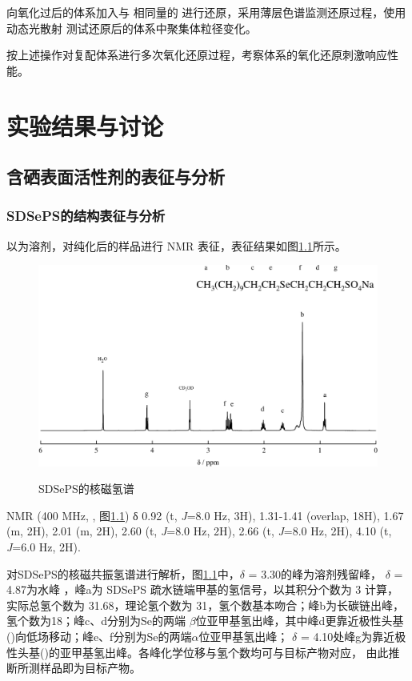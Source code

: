 \documentclass[bachelor,winfonts,replaceperiod]{jnuthesis}
\begin{document}
    向氧化过后的体系加入与  相同量的  进行还原，采用薄层色谱监测还原过程，使用动态光散射
    测试还原后的体系中聚集体粒径变化。
    
    按上述操作对复配体系进行多次氧化还原过程，考察体系的氧化还原刺激响应性能。
    
    \chapter{实验结果与讨论}\label{chapter:results}
    \section{含硒表面活性剂的表征与分析}
    \subsection{SDSePS的结构表征与分析}
    以为溶剂，对纯化后的样品进行 NMR 表征，表征结果如图\ref{fig:SDSePS-nmr}所示。
    \begin{figure}[htbp]
        \centering
        \includegraphics[width=.75\textwidth]{figure/SDSePS-nmr.pdf}\\
        \caption{SDSePS的核磁氢谱}\label{fig:SDSePS-nmr}
    \end{figure}
     
     NMR (400 MHz, , 图\ref{fig:SDSePS-nmr}) δ 0.92 (t, \textit{J}=8.0 Hz, 3H), 1.31-1.41 (overlap, 18H), 
    1.67 (m, 2H), 2.01 (m, 2H), 2.60 (t, \textit{J}=8.0 Hz, 2H), 2.66 (t, \textit{J}=8.0 Hz, 2H),  4.10 (t, \textit{J}=6.0 Hz, 2H).
    
    对SDSePS的核磁共振氢谱进行解析，图\ref{fig:SDSePS-nmr}中，$\delta$ = 3.30的峰为溶剂残留峰，
    $\delta$ = 4.87为水峰\cite{波谱解析} ，峰a为 SDSePS 疏水链端甲基的氢信号，以其积分个数为 3 计算，
    实际总氢个数为 31.68，理论氢个数为 31，氢个数基本吻合；峰b为长碳链出峰，氢个数为18；峰c、d分别为Se的两端
    $\beta$位亚甲基氢出峰，其中峰d更靠近极性头基()向低场移动；峰e、f分别为Se的两端$\alpha$位亚甲基氢出峰；
    $\delta$ = 4.10处峰g为靠近极性头基()的亚甲基氢出峰。各峰化学位移与氢个数均可与目标产物对应，
    由此推断所测样品即为目标产物。
    
\end{document}
